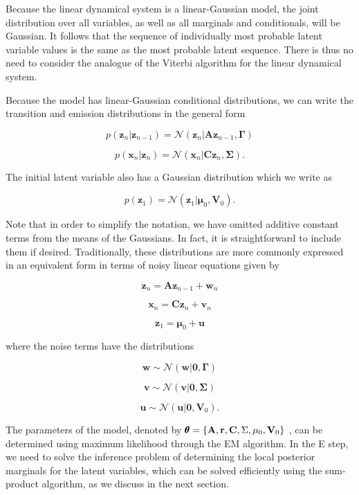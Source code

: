 \documentclass[
  10
]{article}
\begin{document}
Because the linear dynamical system is a linear-Gaussian model, the
joint distribution over all variables, as well as all marginals and
conditionals, will be Gaussian. It follows that the sequence of
individually most probable latent variable values is the same as the
most probable latent sequence. There is thus no need to consider the
analogue of the Viterbi algorithm for the linear dynamical system.

Because the model has linear-Gaussian conditional distributions, we can
write the transition and emission distributions in the general form

\[
{p (\mathbf {z} _ {n} | \mathbf {z} _ {n - 1})} = {\mathcal {N} (\mathbf {z} _ {n} | \mathbf {A z} _ {n - 1}, \boldsymbol {\Gamma})}\tag{13.75}
\]

\[
{p (\mathbf {x} _ {n} | \mathbf {z} _ {n})} = {\mathcal {N} (\mathbf {x} _ {n} | \mathbf {C z} _ {n}, \boldsymbol {\Sigma}).}\tag{13.76}
\]

The initial latent variable also has a Gaussian distribution which we
write as

\[
p (\mathbf {z} _ {1}) = \mathcal {N} (\mathbf {z} _ {1} | \boldsymbol {\mu} _ {0}, \mathbf {V} _ {0}).\tag{13.77}
\]

Note that in order to simplify the notation, we have omitted additive
constant terms from the means of the Gaussians. In fact, it is
straightforward to include them if desired. Traditionally, these
distributions are more commonly expressed in an equivalent form in terms
of noisy linear equations given by

\[
{\mathbf z} _ {n} = {\mathbf A} {\mathbf z} _ {n - 1} + {\mathbf w} _ {n}\tag{13.78}
\]

\[
{\mathbf {x} _ {n}} = {\mathbf {C z} _ {n} + \mathbf {v} _ {n}}\tag{13.79}
\]

\[
{\mathbf z} _ {1} = {\pmb \mu} _ {0} + {\mathbf u}\tag{13.80}
\]

where the noise terms have the distributions

\[
\mathbf {w} \sim \mathcal {N} (\mathbf {w} | \mathbf {0}, \boldsymbol {\Gamma})\tag{13.81}
\]

\[
\mathbf {v} \sim \mathcal {N} (\mathbf {v} | \mathbf {0}, \boldsymbol {\Sigma})\tag{13.82}
\]

\[
\mathbf {u} \sim \mathcal {N} (\mathbf {u} | \mathbf {0}, \mathbf {V} _ {0}).\tag{13.83}
\]

The parameters of the model, denoted by
\(\pmb \theta = \{ { \bf A } , { \bf r } , { \bf C } , \Sigma , \mu _ { 0 } , { \bf V } _ { 0 } \}\)
, can be determined using maximum likelihood through the EM algorithm.
In the E step, we need to solve the inference problem of determining the
local posterior marginals for the latent variables, which can be solved
efficiently using the sum-product algorithm, as we discuss in the next
section.
\end{document}
